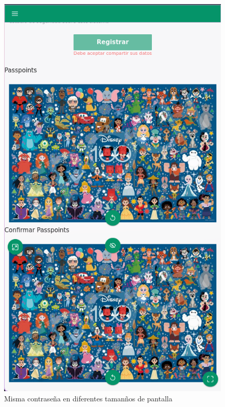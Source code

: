 \begin{anexos}
\begin{figure}[H]
\begin{minipage}[b]{0.68\linewidth}
	\end{minipage}%
	\hfill
	\begin{minipage}[b]{0.3\linewidth} %
		\centering
		\includegraphics[width=\linewidth]{Graphics/capturas/password-mobile.png}
	          
	\end{minipage}
	
	
		\caption{Misma contrase\~na en diferentes taman\~nos de pantalla }
			\label{screen-shapes-variety}
\end{figure}


\end{anexos}
